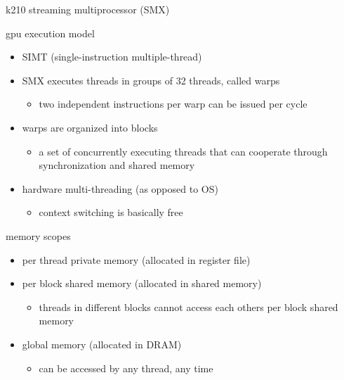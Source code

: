 \documentclass[10pt,t]{beamer}
\begin{document}
\begin{frame}{k210 streaming multiprocessor (SMX)}
  \end{frame}

  \begin{frame}{gpu execution model}
    \begin{itemize}
      \item SIMT (single-instruction multiple-thread)
      \item SMX executes threads in groups of 32 threads, called warps
        \begin{itemize}
          \item two independent instructions per warp can be issued per cycle
        \end{itemize}
      \item warps are organized into blocks
        \begin{itemize}
          \item a set of concurrently executing threads that can cooperate
            through synchronization and shared memory
        \end{itemize}
      \item hardware multi-threading (as opposed to OS)
        \begin{itemize}
          \item context switching is basically free
        \end{itemize}
    \end{itemize}

  \end{frame}

  \begin{frame}{memory scopes}
    \begin{itemize}
      \item per thread private memory (allocated in register file)
      \item per block shared memory (allocated in shared memory)
        \begin{itemize}
          \item threads in different blocks cannot access each others per block
            shared memory
        \end{itemize}
      \item global memory (allocated in DRAM)
        \begin{itemize}
          \item can be accessed by any thread, any time
        \end{itemize}
    \end{itemize}
  \end{frame}
\end{document}
